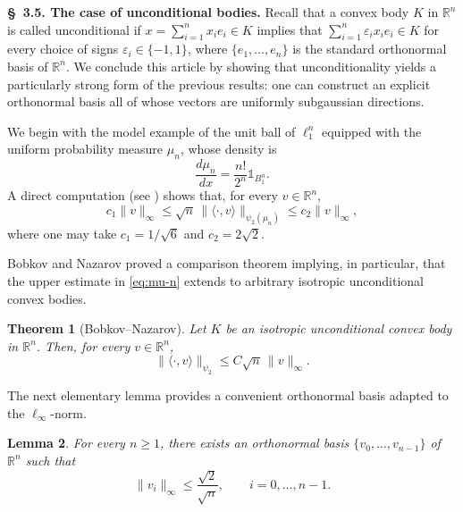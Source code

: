 \documentclass[10pt,a4paper]{amsart}
\newtheorem{theorem}{Theorem}[section]
\newtheorem{lemma}[theorem]{Lemma}
\numberwithin{equation}{section}
\newcommand{\ls}{\leqslant}
\begin{document}
\medskip 

\noindent \textbf{\S~3.5. The case of unconditional bodies.}
Recall that a convex body $K$ in $\mathbb{R}^n$ is called unconditional if $x=\sum_{i=1}^n x_i e_i\in K$ implies that
$\sum_{i=1}^n\varepsilon_i x_i e_i\in K$ for every choice of signs $\varepsilon_i\in\{-1,1\}$, where
$\{e_1,\ldots,e_n\}$ is the standard orthonormal basis of $\mathbb{R}^n$.
We conclude this article by showing that unconditionality yields a particularly strong form of the previous results: one can construct an explicit orthonormal basis all of whose vectors are uniformly subgaussian directions.

We begin with the model example of the unit ball of $\ell_1^n$ equipped with the uniform probability measure $\mu_n$, whose density is
\[\frac{d\mu_n}{dx}=\frac{n!}{2^n}\mathds{1}_{B_1^n}.\]
A direct computation (see \cite{Bobkov-Nazarov-2003}) shows that, for every $v\in\mathbb{R}^n$,
\begin{equation}\label{eq:mu-n}
c_1\|v\|_\infty\ls\sqrt n\,\|\langle\cdot,v\rangle\|_{\psi_2(\mu_n)}\ls c_2\|v\|_\infty,
\end{equation}
where one may take $c_1=1/\sqrt6$ and $c_2=2\sqrt2$.

Bobkov and Nazarov \cite{Bobkov-Nazarov-2003} proved a comparison theorem implying, in particular, that the upper estimate in \eqref{eq:mu-n} extends to 
arbitrary isotropic unconditional convex bodies.

\begin{theorem}[Bobkov--Nazarov]\label{th:unco-psi-2}
Let $K$ be an isotropic unconditional convex body in $\mathbb{R}^n$. Then, for every $v\in\mathbb{R}^n$,
\[\|\langle\cdot,v\rangle\|_{\psi_2}\ls C\sqrt n\,\|v\|_\infty.\]
\end{theorem}

The next elementary lemma provides a convenient orthonormal basis adapted to the $\ell_\infty$-norm.

\begin{lemma}\label{lem:fourier-basis}
For every $n\ge1$, there exists an orthonormal basis $\{v_0,\ldots,v_{n-1}\}$ of $\mathbb{R}^n$ such that
\[\|v_i\|_\infty\ls\frac{\sqrt2}{\sqrt n},\qquad i=0,\ldots,n-1.\]
\end{lemma}
\end{document}
